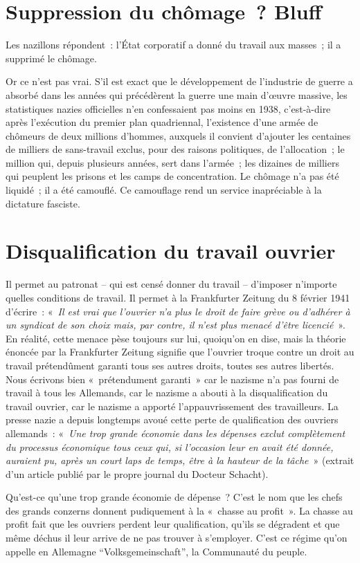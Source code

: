 \documentclass[french,twoside]{book} %
\begin{document}
\section[Suppression du chômage ? Bluff]{Suppression du chômage ? Bluff}
\noindent Les nazillons répondent : l’État corporatif a donné du travail aux masses ; il a supprimé le chômage.\par
Or ce n’est pas vrai. S’il est exact que le développement de l’industrie de guerre a absorbé dans les années qui précédèrent la guerre une main d’œuvre massive, les statistiques nazies officielles n’en confessaient pas moins en 1938, c’est-à-dire après l’exécution du premier plan quadriennal, l’existence d’une armée de chômeurs de deux millions d’hommes, auxquels il convient d’ajouter les centaines de milliers de sans-travail exclus, pour des raisons politiques, de l’allocation ; le million qui, depuis plusieurs années, sert dans l’armée ; les dizaines de milliers qui peuplent les prisons et les camps de concentration. Le chômage n’a pas été liquidé ; il a été camouflé. Ce camouflage rend un service inapréciable à la dictature fasciste.
\section[Disqualification du travail ouvrier]{Disqualification du travail ouvrier}
\noindent Il permet au patronat – qui est censé donner du travail – d’imposer n’importe quelles conditions de travail. Il permet à la Frankfurter Zeitung du 8 février 1941 d’écrire : « \emph{Il est vrai que l’ouvrier n’a plus le droit de faire grève ou d’adhérer à un syndicat de son choix mais, par contre, il n’est plus menacé d’être licencié} ». En réalité, cette menace pèse toujours sur lui, quoiqu’on en dise, mais la théorie énoncée par la Frankfurter Zeitung signifie que l’ouvrier troque contre un droit au travail prétendûment garanti tous ses autres droits, toutes ses autres libertés. Nous écrivons bien « prétendument garanti » car le nazisme n’a pas fourni de travail à tous les Allemands, car le nazisme a abouti à la disqualification du travail ouvrier, car le nazisme a apporté l’appauvrissement des travailleurs. La presse nazie a depuis longtemps avoué cette perte de qualification des ouvriers allemands : « \emph{Une trop grande économie dans les dépenses exclut complètement du processus économique tous ceux qui, si l’occasion leur en avait été donnée, auraient pu, après un court laps de temps, être à la hauteur de la tâche} » (extrait d’un article publié par le propre journal du Docteur Schacht).\par
Qu’est-ce qu’une trop grande économie de dépense ? C’est le nom que les chefs des grands conzerns donnent pudiquement à la « chasse au profit ». La chasse au profit fait que les ouvriers perdent leur qualification, qu’ils se dégradent et que même déchus il leur arrive de ne pas trouver à s’employer. C’est ce régime qu’on appelle en Allemagne “Volksgemeinschaft”, la Communauté du peuple.
\end{document}
